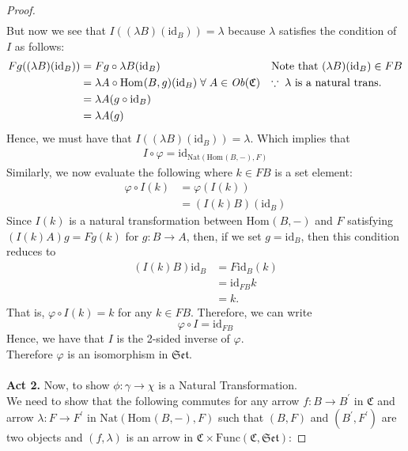 \documentclass{article}
\theoremstyle{definition}
\theoremstyle{remark}
\theoremstyle{definition}
\theoremstyle{definition}
\theoremstyle{definition}
\newcommand{\cat}[1]{\mathfrak{#1}}
\newcommand{\obj}[1]{\text{\textit{Ob}}(#1)}
\newcommand{\Id}[1]{\text{id}_{#1}}
\newcommand{\homset}[3]{\text{Hom}_{#1}(#2,#3)}
\newcommand{\Func}[2]{\text{Func}\left (#1,#2\right )}
\newcommand{\Nat}[2]{\text{Nat}\left (#1,#2\right )}
\begin{document}
\begin{proof}
\begin{equation*}
\begin{split}
	\end{split}
\end{equation*}
But now we see that $ I((\lambda B)(\Id{B}))  = \lambda$ because $ \lambda $ satisfies the condition of $ I $ as follows:
	\begin{align*}
		Fg((\lambda B)(\Id{B})) &= Fg\circ \lambda B (\Id{B}) && \text{Note that $ (\lambda B)(\Id{B}) \in FB$}\\
		&= \lambda A \circ \homset{}{B}{g} (\Id{B})\;\forall\;A \in \obj{\cat{C}}&& \text{$ \because \;\lambda$ is a natural trans.}\\
		&= \lambda A (g\circ \Id{B})&&\\
		&= \lambda A(g)
	\end{align*}
Hence, we must have that $ I((\lambda B)(\Id{B})) = \lambda $. Which implies that
\begin{equation*}
	\begin{split}
		I \circ \varphi = \Id{\Nat{\homset{}{B}{-}}{F}}
	\end{split}
\end{equation*}
Similarly, we now evaluate the following where $ k\in FB $ is a set element:
\begin{equation*}
	\begin{split}
		\varphi\circ I (k) &= \varphi(I(k))\\
		&= (I(k)B) (\Id{B})
	\end{split}
\end{equation*}
Since $ I(k) $ is a natural transformation between $ \homset{}{B}{-} $ and $ F $ satisfying $ (I(k) A)g = Fg(k) $ for $ g : B\to A $, then, if we set $ g = \Id{B} $, then this condition reduces to
\begin{equation*}
	\begin{split}
		(I(k) B)\Id{B} &= F\Id{B}(k)\\
		&= \Id{FB} k\\
		&= k.
	\end{split}
\end{equation*}
That is, $ \varphi \circ I(k) = k $ for any $ k\in FB $. Therefore, we can write
\[\varphi \circ I  = \Id{FB}\]
Hence, we have that $ I $ is the 2-sided inverse of $ \varphi $.\\
 Therefore $ \varphi $ is an isomorphism in $ \cat{Set} $.\\\\
 \textbf{Act 2.} Now, to show $ \phi : \gamma \to \chi $ is a Natural Transformation. \\
 We need to show that the following commutes for any arrow $ f : B \to B^{\prime} $ in $ \cat{C} $ and arrow $ \lambda : F\to F^{\prime}$ in $ \Nat{\homset{}{B}{-}}{F} $ such that $ (B,F) $ and $ (B^{\prime}, F^{\prime}) $ are two objects and $ (f,\lambda) $ is an arrow in $ \cat{C}\times\Func{\cat{C}}{\cat{Set}} $:

\end{proof}
\end{document}
